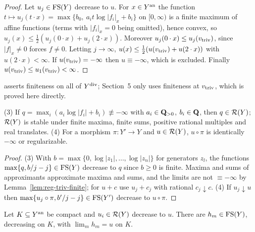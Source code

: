 \begin{proof}
Let $u_j\in\mathrm{FS}(Y)$ decrease to $u$. For $x\in Y^{\mathrm{an}}$ the function
$t\mapsto u_j(t\cdot x)=\max\{b_0,\ a_it\log|f_i|_x+b_i\}$ on $[0,\infty)$ is a finite maximum of
affine functions (terms with $|f_i|_x=0$ being omitted), hence convex, so
$u_j(x)\le\frac12(u_j(0\cdot x)+u_j(2\cdot x))$. Moreover $u_j(0\cdot x)\le u_j(v_{\mathrm{triv}})$, since
$|f|_x\ne0$ forces $f\ne0$. Letting $j\to\infty$,
$u(x)\le\frac12(u(v_{\mathrm{triv}})+u(2\cdot x))$ with $u(2\cdot x)<\infty$. If $u(v_{\mathrm{triv}})=-\infty$ then
$u\equiv-\infty$, which is excluded. Finally $u(v_{\mathrm{triv}})\le u_1(v_{\mathrm{triv}})<\infty$.
\end{proof}

\begin{remark}\label{rmk:triv-finite-scope}
\cite[Lemma~5.11(1)]{FHX} asserts finiteness on all of $Y^{\mathrm{div}}$; Section~5 only uses
finiteness at $v_{\mathrm{triv}}$, which is proved here directly.
\end{remark}

\begin{lemma}\label{lem:reg-closure-elementary}
\leanok
{}
(3) If $q=\max_i(a_i\log|f_i|+b_i)\not\equiv-\infty$ with $a_i\in\mathbf{Q}_{>0}$, $b_i\in\mathbf{Q}$, then
$q\in\mathcal{R}(Y)$; $\mathcal{R}(Y)$ is stable under finite maxima, finite sums, positive rational multiples
and real translates. (4) For a morphism $\pi\colon Y'\to Y$ and $u\in\mathcal{R}(Y)$, $u\circ\pi$ is
identically $-\infty$ or regularizable.
\end{lemma}

\begin{proof}
(3) With $b=\max\{0,\log|z_1|,\dots,\log|z_n|\}$ for generators $z_l$, the functions
$\max\{q,b/j-j\}\in\mathrm{FS}(Y)$ decrease to $q$ since $b\ge0$ is finite. Maxima and sums of
approximants approximate maxima and sums, and the limits are not $\equiv-\infty$ by
Lemma~\ref{lem:reg-triv-finite}; for $u+c$ use $u_j+c_j$ with rational $c_j\downarrow c$.
(4) If $u_j\downarrow u$ then $\max\{u_j\circ\pi,b'/j-j\}\in\mathrm{FS}(Y')$ decrease to $u\circ\pi$.
\end{proof}

\begin{lemma}\label{lem:diagonal-compact}
\leanok
{}
Let $K\subseteq Y^{\mathrm{an}}$ be compact and $u_i\in\mathcal{R}(Y)$ decrease to $u$. There are $h_m\in\mathrm{FS}(Y)$,
decreasing on $K$, with $\lim_mh_m=u$ on $K$.
\end{lemma}

